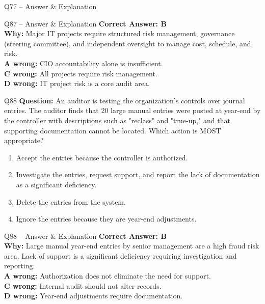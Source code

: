 \documentclass[aspectratio=169,10pt]{beamer}
\begin{document}
\begin{frame}[t]{Q77 -- Answer \& Explanation}
	\begin{frame}[t]{Q87 -- Answer \& Explanation}
		\small
		\textbf{Correct Answer: B} \\[4pt]
		\textbf{Why:} Major IT projects require structured risk management, governance (steering committee), and independent oversight to manage cost, schedule, and risk. \\[4pt]
		\textbf{A wrong:} CIO accountability alone is insufficient. \\[2pt]
		\textbf{C wrong:} All projects require risk management. \\[2pt]
		\textbf{D wrong:} IT project risk is a core audit area.
	\end{frame}
	
	\begin{frame}[t]{Q88}
		\small
		\textbf{Question:} An auditor is testing the organization's controls over journal entries. The auditor finds that 20 large manual entries were posted at year-end by the controller with descriptions such as "reclass" and "true-up," and that supporting documentation cannot be located. Which action is MOST appropriate?
		\begin{enumerate}[label=\Alph*.,itemsep=1pt,topsep=2pt]
			\item Accept the entries because the controller is authorized.
			\item Investigate the entries, request support, and report the lack of documentation as a significant deficiency.
			\item Delete the entries from the system.
			\item Ignore the entries because they are year-end adjustments.
		\end{enumerate}
	\end{frame}
	
	\begin{frame}[t]{Q88 -- Answer \& Explanation}
		\small
		\textbf{Correct Answer: B} \\[4pt]
		\textbf{Why:} Large manual year-end entries by senior management are a high fraud risk area. Lack of support is a significant deficiency requiring investigation and reporting. \\[4pt]
		\textbf{A wrong:} Authorization does not eliminate the need for support. \\[2pt]
		\textbf{C wrong:} Internal audit should not alter records. \\[2pt]
		\textbf{D wrong:} Year-end adjustments require documentation.
	\end{frame}
	

\end{frame}
\end{document}
